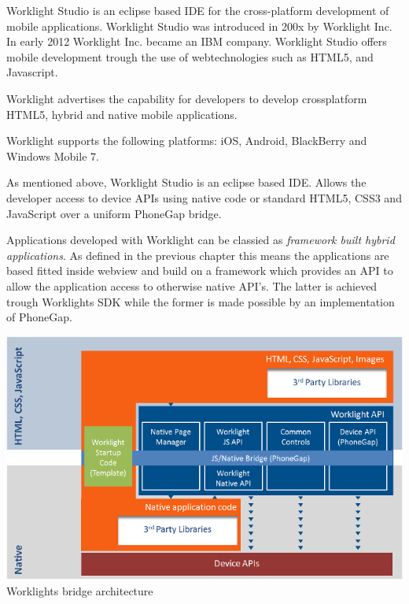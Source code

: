 



Worklight Studio is an eclipse based IDE for the cross-platform development of mobile applications. Worklight Studio was introduced in 200x by Worklight Inc. In early 2012 Worklight Inc. became an IBM company. Worklight Studio offers mobile development trough the use of webtechnologies such as HTML5, and Javascript.

Worklight advertises the capability for developers to develop crossplatform HTML5, hybrid and native mobile applications.


Worklight supports the following platforms: iOS, Android, BlackBerry and Windows Mobile 7.

As mentioned above, Worklight Studio is an eclipse based IDE.
Allows the developer access to device APIs using native code or standard HTML5, CSS3 and JavaScript over a uniform PhoneGap bridge.


Applications developed with Worklight can be classied as \emph{framework built hybrid applications}. As defined in the previous chapter this means the applications are based fitted inside webview and build on a framework which provides an API to allow the application access to otherwise native API's. The latter is achieved trough Worklights SDK while the former is made possible by an implementation of PhoneGap. \cite{Inc2012}

\begin{centering}
	\includegraphics[scale=0.5]{images/Worklight_architecture.png}\\{Worklights bridge architecture\cite{Inc2012a}}\\
\end{centering}

